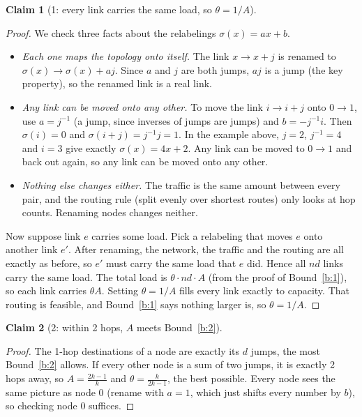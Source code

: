 \documentclass[11pt]{article}
\theoremstyle{definition}
\newtheorem*{claim}{Claim}
\begin{document}
\begin{claim}[1: every link carries the same load, so $\theta = 1/A$]
\end{claim}
\begin{proof}
We check three facts about the relabelings $\sigma(x) = ax+b$.
\begin{itemize}
\item \emph{Each one maps the topology onto itself.} The link $x \to x+j$ is renamed to $\sigma(x) \to \sigma(x) + aj$.
  Since $a$ and $j$ are both jumps, $aj$ is a jump (the key property), so the renamed link is a real link.
\item \emph{Any link can be moved onto any other.} To move the link $i \to i+j$ onto $0 \to 1$, use $a = j^{-1}$ (a
  jump, since inverses of jumps are jumps) and $b = -j^{-1} i$. Then $\sigma(i) = 0$ and $\sigma(i+j) = j^{-1}j = 1$.
  In the example above, $j=2$, $j^{-1}=4$ and $i=3$ give exactly $\sigma(x)=4x+2$. Any link can be moved to $0\to1$
  and back out again, so any link can be moved onto any other.
\item \emph{Nothing else changes either.} The traffic is the same amount between every pair, and the routing rule
  (split evenly over shortest routes) only looks at hop counts. Renaming nodes changes neither.
\end{itemize}
Now suppose link $e$ carries some load. Pick a relabeling that moves $e$ onto another link $e'$. After renaming, the
network, the traffic and the routing are all exactly as before, so $e'$ must carry the same load that $e$ did. Hence
all $nd$ links carry the same load. The total load is $\theta \cdot nd \cdot A$ (from the proof of Bound~\ref{b:1}),
so each link carries $\theta A$. Setting $\theta = 1/A$ fills every link exactly to capacity. That routing is
feasible, and Bound~\ref{b:1} says nothing larger is, so $\theta = 1/A$.
\end{proof}

\begin{claim}[2: within 2 hops, $A$ meets Bound~\ref{b:2}]
\end{claim}
\begin{proof}
The 1-hop destinations of a node are exactly its $d$ jumps, the most Bound~\ref{b:2} allows. If every other node is
a sum of two jumps, it is exactly 2 hops away, so $A = \frac{2k-1}{k}$ and $\theta = \frac{k}{2k-1}$, the best
possible. Every node sees the same picture as node 0 (rename with $a=1$, which just shifts every number by $b$), so
checking node 0 suffices.
\end{proof}
\end{document}
